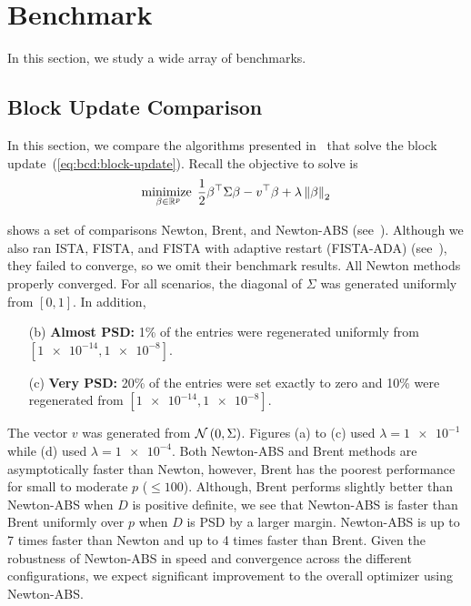 \section{Benchmark}\label{sec:benchmark}

In this section, we study a wide array of benchmarks.

\subsection{Block Update Comparison}\label{ssec:benchmark:pgd-newton}

In this section, we compare the algorithms presented 
in~
that solve the block update~(\ref{eq:bcd:block-update}).
Recall the objective to solve is
\begin{align*}
    \operatorname*{minimize\;}_{\beta \in \mathbb{R}^p}
    \frac{1}{2} \beta^\top \Sigma \beta
    - v^\top \beta
    + \lambda \left\|\beta\right\|_2
\end{align*}

 shows a set of comparisons
Newton, Brent, and Newton-ABS
(see~).
Although we also ran ISTA, FISTA, and FISTA with adaptive restart (FISTA-ADA)
(see~), they failed to converge, so we omit their benchmark results.
All Newton methods properly converged.
For all scenarios, the diagonal of $\Sigma$ was generated uniformly from $[0, 1]$.
In addition,
\begin{enumerate}
    \item[(b)] \textbf{Almost PSD:} 1\% of the entries were regenerated uniformly from $[\num{1e-14}, \num{1e-8}]$.
    \item[(c)] \textbf{Very PSD:} 20\% of the entries were set exactly to zero and 10\% were regenerated from $[\num{1e-14}, \num{1e-8}]$.
\end{enumerate}
The vector $v$ was generated from $\mathcal{N}\left(0, \Sigma\right)$.
Figures (a) to (c) used $\lambda=\num{1e-1}$ while (d) used $\lambda=\num{1e-4}$.
Both Newton-ABS and Brent methods are asymptotically faster than Newton,
however, Brent has the poorest performance for small to moderate $p$ ($\leq 100$).
Although, Brent performs slightly better than Newton-ABS when $D$ is positive definite,
we see that Newton-ABS is faster than Brent uniformly over $p$ when $D$ is PSD
by a larger margin.
Newton-ABS is up to 7 times faster than Newton and up to 4 times faster than Brent.
Given the robustness of Newton-ABS in speed and convergence across the different configurations,
we expect significant improvement to the overall optimizer using Newton-ABS.

